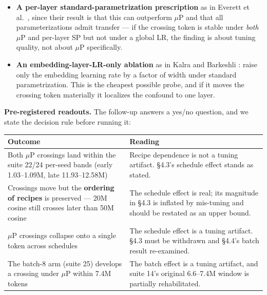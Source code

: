 \begin{itemize}
\tightlist
\item
  \textbf{A per-layer standard-parametrization prescription} as in Everett et al.~\cite{ref32}, since their
  result is that this can outperform $\mu$P and that all parameterizations admit transfer --- if the
  crossing token is stable under \emph{both} $\mu$P and per-layer SP but not under a global LR, the finding
  is about tuning quality, not about $\mu$P specifically.
\item
  \textbf{An embedding-layer-LR-only ablation} as in Kalra and Barkeshli \cite{ref35}: raise only the embedding
  learning rate by a factor of width under standard parametrization. This is the cheapest possible
  probe, and if it moves the crossing token materially it localizes the confound to one layer.
\end{itemize}

\textbf{Pre-registered readouts.} The follow-up answers a yes/no question, and we state the decision
rule before running it:

{%
{\small\begin{longtable}[]{@{}
  >{\raggedright\arraybackslash}p{}
  >{\raggedright\arraybackslash}p{}@{}}
\toprule\noalign{}
\begin{minipage}[b]{\linewidth}\raggedright
Outcome
\end{minipage} & \begin{minipage}[b]{\linewidth}\raggedright
Reading
\end{minipage} \\
\midrule\noalign{}
\endhead
\bottomrule\noalign{}
\endlastfoot
Both $\mu$P crossings land within the suite 22/24 per-seed bands (early 1.03--1.09M, late 11.93--12.58M) & Recipe dependence is not a tuning artifact. \S4.3's schedule effect stands as stated. \\
Crossings move but the \textbf{ordering of recipes} is preserved --- 20M cosine still crosses later than 50M cosine & The schedule effect is real; its magnitude in \S4.3 is inflated by mis-tuning and should be restated as an upper bound. \\
$\mu$P crossings collapse onto a single token across schedules & The schedule effect is a tuning artifact. \S4.3 must be withdrawn and \S4.4's batch result re-examined. \\
The batch-8 arm (suite 25) develops a crossing under $\mu$P within 7.4M tokens & The batch effect is a tuning artifact, and suite 14's original 6.6--7.4M window is partially rehabilitated. \\
\end{longtable}}
}

